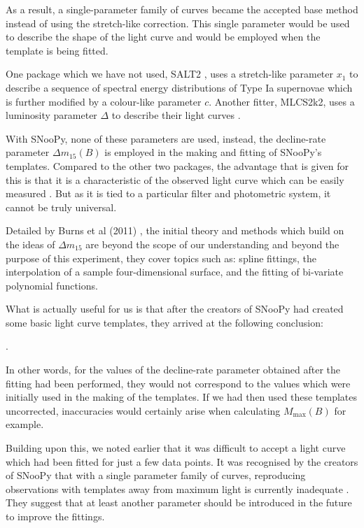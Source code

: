 \documentclass[twocolumn]{revtex4}
\begin{document}
As a result, a single-parameter family of curves became the accepted base method instead of using the stretch-like correction. This single parameter would be used to describe the shape of the light curve and would be employed when the template is being fitted.

One package which we have not used, SALT2 \cite{salt2}, uses a stretch-like parameter $x_1$ to describe a sequence of spectral energy distributions of Type Ia supernovae which is further modified by a colour-like parameter $c$. Another fitter, MLCS2k2, uses a luminosity parameter $\Delta$ to describe their light curves \cite{prec_indic, mlcs2k2}. 

With SNooPy, none of these parameters are used, instead, the decline-rate parameter $\Delta m_{15}(B)$ is employed in the making and fitting of SNooPy's templates. Compared to the other two packages, the advantage that is given for this is that it is a characteristic of the observed light curve which can be easily measured \cite{car_snoopy}. But as it is tied to a particular filter and photometric system, it cannot be truly universal.

Detailed by Burns et al (2011) \cite{car_snoopy}, the initial theory and methods which build on the ideas of $\Delta m_{15}$ are beyond the scope of our understanding and beyond the purpose of this experiment, they cover topics such as: spline fittings, the interpolation of a sample four-dimensional surface, and the fitting of bi-variate polynomial functions. 

What is actually useful for us is that after the creators of SNooPy had created some basic light curve templates, they arrived at the following conclusion:

 \cite{car_snoopy}.

In other words, for the values of the decline-rate parameter obtained after the fitting had been performed, they would not correspond to the values which were initially used in the making of the templates. If we had then used these templates uncorrected, inaccuracies would certainly arise when calculating $M_{\max}(B)$ for example. 

Building upon this, we noted earlier that it was difficult to accept a light curve which had been fitted for just a few data points. It was recognised by the creators of SNooPy that with a single parameter family of curves, reproducing observations with templates away from maximum light is currently inadequate \cite{car_snoopy}. They suggest that at least another parameter should be introduced in the future to improve the fittings.  
\end{document}
